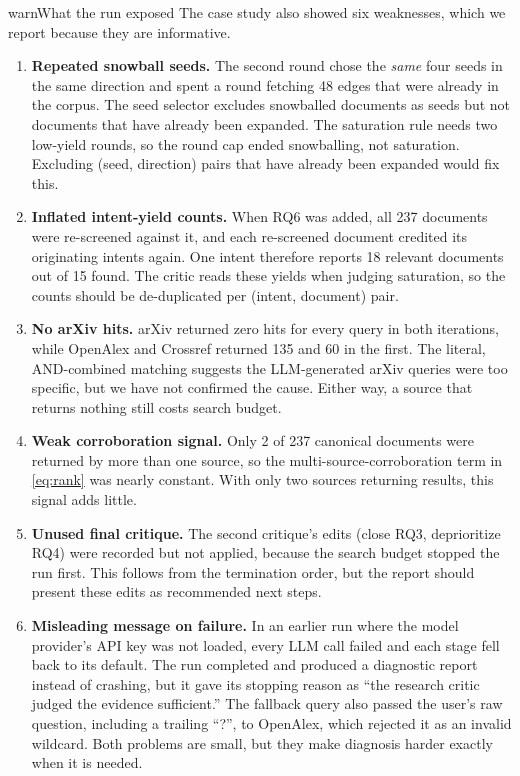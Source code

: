 \documentclass[10pt,a4paper]{article}
\begin{document}
\begin{callout}{warn}{What the run exposed}
The case study also showed six
weaknesses, which we report because they are informative.
\begin{enumerate}[leftmargin=*]
  \item \textbf{Repeated snowball seeds.} The second round chose the
    \emph{same} four seeds in the same direction and spent a round
    fetching 48 edges that were already in the corpus. The seed selector
    excludes snowballed documents as seeds but not documents that have
    already been expanded. The saturation rule needs two low-yield rounds,
    so the round cap ended snowballing, not saturation. Excluding
    (seed, direction) pairs that have already been expanded would fix this.
  \item \textbf{Inflated intent-yield counts.} When RQ6 was added, all 237
    documents were re-screened against it, and each re-screened document
    credited its originating intents again. One intent therefore reports
    18 relevant documents out of 15 found. The critic reads these yields
    when judging saturation, so the counts should be de-duplicated per
    (intent, document) pair.
  \item \textbf{No arXiv hits.} arXiv returned zero hits for every query
    in both iterations, while OpenAlex and Crossref returned 135 and 60 in
    the first. The literal, AND-combined matching suggests the
    LLM-generated arXiv queries were too specific, but we have not
    confirmed the cause. Either way, a source that returns nothing still
    costs search budget.
  \item \textbf{Weak corroboration signal.} Only 2 of 237 canonical
    documents were returned by more than one source, so the
    multi-source-corroboration term in \cref{eq:rank} was nearly constant.
    With only two sources returning results, this signal adds little.
  \item \textbf{Unused final critique.} The second critique's edits (close
    RQ3, deprioritize RQ4) were recorded but not applied, because the
    search budget stopped the run first. This follows from the termination
    order, but the report should present these edits as recommended next
    steps.
  \item \textbf{Misleading message on failure.} In an earlier run where the
    model provider's API key was not loaded, every LLM call failed and each
    stage fell back to its default. The run completed and produced a
    diagnostic report instead of crashing, but it gave its stopping reason
    as ``the research critic judged the evidence sufficient.'' The fallback
    query also passed the user's raw question, including a trailing
    ``?'', to OpenAlex, which rejected it as an invalid wildcard. Both
    problems are small, but they make diagnosis harder exactly when it is
    needed.
\end{enumerate}
\end{callout}
\end{document}
